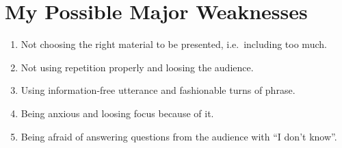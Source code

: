 \section{My Possible Major Weaknesses}
\begin{enumerate}
    \item Not choosing the right material to be presented, i.e.\ including too much.
    \item Not using repetition properly and loosing the audience.
    \item Using information-free utterance and fashionable turns of phrase.
    \item Being anxious and loosing focus because of it.
    \item Being afraid of answering questions from the audience with \enquote{I don't know}.
\end{enumerate}
